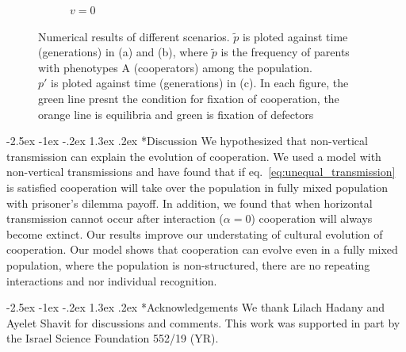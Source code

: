 \documentclass[12pt]{extarticle}
\makeatletter
\renewcommand\section{\@startsection {section}{1}{\z@}%
     {-2.5ex \@plus -1ex \@minus -.2ex}%
     {1.3ex \@plus.2ex}%
    {\Large\bfseries}}
\makeatother
\begin{document}
\begin{figure}[H]
\begin{subfigure}{8cm}
    \caption{$v=0$}
    \label{fig:results_c}
  \end{subfigure}
  \label{fig:results}
  \caption{Numerical results of different scenarios. $\tilde{p}$ is ploted against time (generations) in (a) and (b), where $\tilde{p}$ is the frequency of parents with phenotypes A (cooperators) among the population. \\ $p'$ is ploted against time (generations) in (c). In each figure, the green line presnt the condition for fixation of cooperation, the orange line is equilibria and green is fixation of defectors}
\end{figure}

\section*{Discussion}
We hypothesized that non-vertical transmission can explain the evolution of cooperation. We used a model with non-vertical transmissions and have found that if eq.~\ref{eq:unequal_transmission} is satisfied cooperation will take over the population in fully mixed population with prisoner's dilemma payoff. In addition, we found that when horizontal transmission cannot occur after interaction ($\alpha = 0$) cooperation will always become extinct. 
Our results improve our understating of cultural evolution of cooperation. Our model shows that cooperation can evolve even in a fully mixed population, where the population is non-structured, there are no repeating interactions and nor individual recognition.

{\small
\section*{Acknowledgements}
We thank Lilach Hadany and Ayelet Shavit for discussions and comments.
This work was supported in part by
the Israel Science Foundation 552/19 (YR).
}




\newpage
\end{document}
